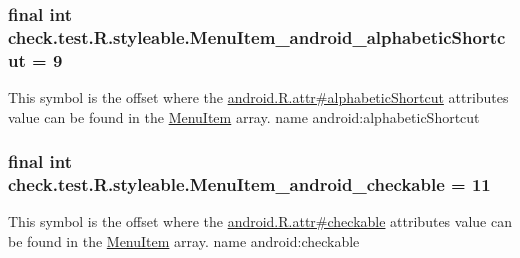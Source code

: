 \subsubsection[{Menu\+Item\+\_\+android\+\_\+alphabetic\+Shortcut}]{\setlength{\rightskip}{0pt plus 5cm}final int check.\+test.\+R.\+styleable.\+Menu\+Item\+\_\+android\+\_\+alphabetic\+Shortcut = 9\hspace{0.3cm}{\ttfamily [static]}}\label{classcheck_1_1test_1_1_r_1_1styleable_a787aabf6b90e6e64c272388b5702e917}
This symbol is the offset where the \hyperlink{}{android.\+R.\+attr\#alphabetic\+Shortcut} attribute\textquotesingle{}s value can be found in the \hyperlink{classcheck_1_1test_1_1_r_1_1styleable_af26376072eab01d1b4197e48992dc936}{Menu\+Item} array.  name android\+:alphabetic\+Shortcut \hypertarget{classcheck_1_1test_1_1_r_1_1styleable_a805d9eb8afc5f5884886c1cfd76c506f}{}
\subsubsection[{Menu\+Item\+\_\+android\+\_\+checkable}]{\setlength{\rightskip}{0pt plus 5cm}final int check.\+test.\+R.\+styleable.\+Menu\+Item\+\_\+android\+\_\+checkable = 11\hspace{0.3cm}{\ttfamily [static]}}\label{classcheck_1_1test_1_1_r_1_1styleable_a805d9eb8afc5f5884886c1cfd76c506f}
This symbol is the offset where the \hyperlink{}{android.\+R.\+attr\#checkable} attribute\textquotesingle{}s value can be found in the \hyperlink{classcheck_1_1test_1_1_r_1_1styleable_af26376072eab01d1b4197e48992dc936}{Menu\+Item} array.  name android\+:checkable \hypertarget{classcheck_1_1test_1_1_r_1_1styleable_a70f7214872e00bf3172089cd9d463d88}{}
